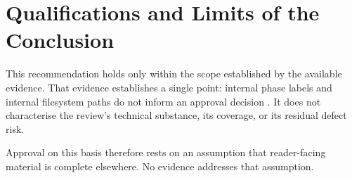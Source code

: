 \section{Qualifications and Limits of the Conclusion}

This recommendation holds only within the scope established by the available evidence. That evidence establishes a single point: internal phase labels and internal filesystem paths do not inform an approval decision \cite{source001}. It does not characterise the review's technical substance, its coverage, or its residual defect risk.

Approval on this basis therefore rests on an assumption that reader-facing material is complete elsewhere. No evidence addresses that assumption.